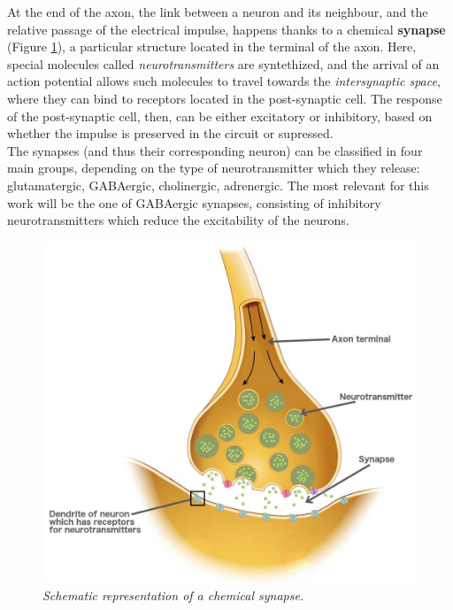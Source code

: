 \documentclass[12pt, a4paper]{report}
\begin{document}
At the end of the axon, the link between a neuron and its neighbour, and the relative passage of the electrical impulse, happens thanks to a chemical \textbf{synapse} (Figure \ref{synapse}), a particular structure located in the terminal of the axon. Here, special molecules called \textit{neurotransmitters} are syntethized, and the arrival of an action potential allows such molecules to travel towards the \textit{intersynaptic space}, where they can bind to receptors located in the post-synaptic cell. The response of the post-synaptic cell, then, can be either excitatory or inhibitory, based on whether the impulse is preserved in the circuit or supressed.\\
The synapses (and thus their corresponding neuron) can be classified in four main groups, depending on the type of neurotransmitter which they release:  glutamatergic, GABAergic, cholinergic,  adrenergic. The most relevant for this work will be the one of GABAergic synapses, consisting of inhibitory neurotransmitters which reduce the excitability of the neurons.
\begin{figure}[H]
	\begin{center}
		\includegraphics[scale=0.2]{synapse.jpg} 
	\end{center} 
	\caption{\textit{Schematic representation of a chemical synapse.}}\label{synapse}
	
\end{figure}
\end{document}
